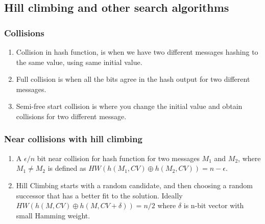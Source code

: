 \documentclass{beamer}
\begin{document}

\subsection{Hill climbing and other search algorithms}

\begin{frame}
\frametitle{Collisions}
\begin{enumerate}
\item Collision in hash function, is when we have two different messages hashing to the same value, using
same initial value.
\item Full collision is when all the bits agree in the hash output for two different messages.
\item Semi-free start collision is where you change the initial value and obtain collisions for two 
different message.
\end{enumerate}
\end{frame}

\begin{frame}
\frametitle{Near collisions with hill climbing}
\begin{enumerate}
\item A $\epsilon / n $ bit near collision for hash function for two messages $M_{1}$ and $M_{2}$, where 
$M_{1} \neq M_{2}$ is defined as $HW( h( M_{1}, CV ) \oplus h( M_{2}, CV ) ) = n - \epsilon $.
\item Hill Climbing starts with a random candidate, and then choosing a random successor that has a better
fit to the solution. Ideally $HW( h(M, CV) \oplus h(M, CV + \delta) ) = n / 2 $ where $\delta$ is n-bit 
vector with small Hamming weight.
\end{enumerate}
\end{frame}
\end{document}
